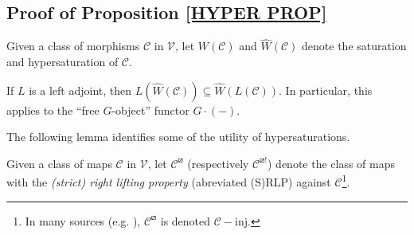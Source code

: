 \documentclass[a4paper,10pt,draft]{article}%
\begin{document}







\newpage




\subsection{Proof of Proposition \ref{HYPER PROP}}



\begin{notation}
      Given a class of morphisms $\mathcal{C}$ in $\mathcal V$, let
      $W(\mathcal C)$ and $\hat{W}(\mathcal C)$ denote
      the saturation and hypersaturation of $\mathcal C$.
\end{notation}

\begin{remark}
      If $L$ is a left adjoint, then $L(\hat{W}(\mathcal C)) \subseteq \hat{W}(L(\mathcal C))$.
      In particular, this applies to the ``free $G$-object'' functor $G \cdot (-)$.
\end{remark}

The following lemma identifies some of the utility of hypersaturations.
\begin{notation}
      Given a class of maps $\mathcal C$ in $\mathcal V$, let $\mathcal C^\boxslash$ (respectively $\mathcal C^{\boxslash !}$)
      denote the class of maps with the
      \textit{(strict) right lifting property} (abreviated (S)RLP) against $\mathcal C$\footnote{
        In many sources (e.g. \cite{Hov99}), $\mathcal C^\boxslash$ is denoted $\mathcal C - \mbox{inj}$.
      }.
\end{notation}
\end{document}
